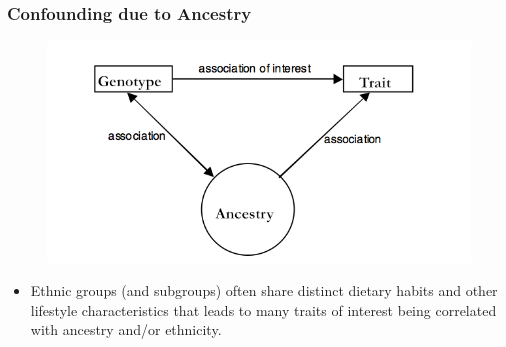 \documentclass{beamer}
\begin{document}
\begin{frame}
\frametitle{\bf Confounding due to Ancestry }
\begin{figure}
\centering
\includegraphics[scale=.4]{Figures/Confounding.png}
\end{figure}
\vspace{-.4cm}
\begin{itemize}
\item Ethnic groups (and subgroups) often share distinct dietary habits and other lifestyle characteristics that
leads to many traits of interest being correlated with ancestry and/or ethnicity.
\end{itemize}
\end{frame}
\end{document}
